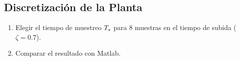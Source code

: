 \subsection{Discretización de la Planta}
\begin{enumerate}[label=2.\arabic*.]
	\item Elegir el tiempo de muestreo $T_s$ para 8 muestras en el tiempo de subida ($\zeta = 0.7$).
	\item Comparar el resultado con Matlab.
\end{enumerate}
